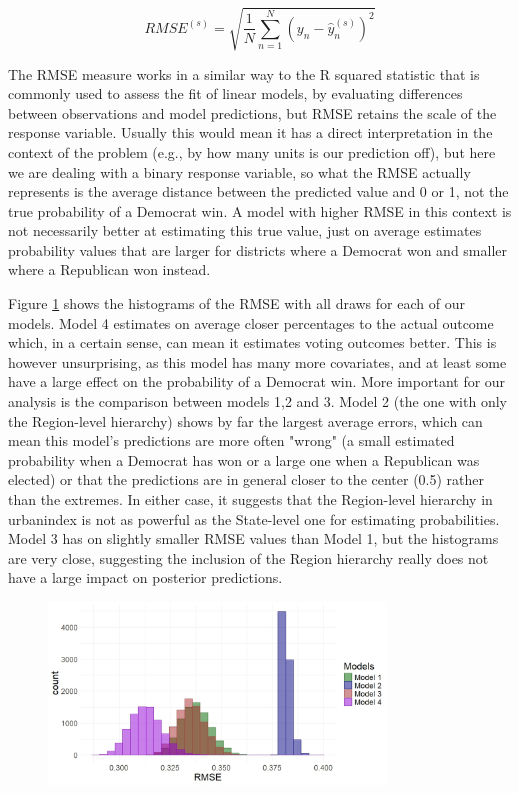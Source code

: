 \documentclass[12pt]{article}
\newcommand{\blue}[1]{\textcolor{blue}{#1}}
\begin{document}
\begin{equation} \label{eq:rmse}
	RMSE^{(s)} = \sqrt{
		\frac{1}{N} 
		\sum_{n = 1}^{N}
		\left( y_n - \hat{y}_n^{(s)} \right)^2
		}
\end{equation}


The RMSE measure works in a similar way to the R squared statistic that is commonly used to assess the fit of linear models, by evaluating differences between observations and model predictions, but RMSE retains the scale of the response variable.
Usually this would mean it has a direct interpretation in the context of the problem (e.g., by how many units is our prediction off), but here we are dealing with a binary response variable, so what the RMSE actually represents is the average distance between the predicted value and 0 or 1, not the true probability of a Democrat win.
A model with higher RMSE in this context is not necessarily better at estimating this true value, just on average estimates probability values that are larger for districts where a Democrat won and smaller where a Republican won instead. 

Figure \ref{fig:rmse} shows the histograms of the RMSE with all draws for each of our models.
Model 4 estimates on average closer percentages to the actual outcome which, in a certain sense, can mean it estimates voting outcomes better. This is however unsurprising, as this model has many more covariates, and at least some have a large effect on the probability of a Democrat win.
More important for our analysis is the comparison between models 1,2 and 3.
Model 2 (the one with only the Region-level hierarchy) shows by far the largest average errors, which can mean this model's predictions are more often "wrong" (a small estimated probability when a Democrat has won or a large one when a Republican was elected) or that the predictions are in general closer to the center (0.5) rather than the extremes. In either case, it suggests that the Region-level hierarchy in urbanindex is not as powerful as the State-level one for estimating probabilities.
Model 3 has on slightly smaller RMSE values than Model 1, but the histograms are very close, suggesting the inclusion of the Region hierarchy really does not have a large impact on posterior predictions.

\begin{figure}[h]
	\centering
	\includegraphics[width=0.8\textwidth]{model_comp_figures/RMSE_all.jpeg}
	\caption{}
	\label{fig:rmse}
\end{figure}
\end{document}
